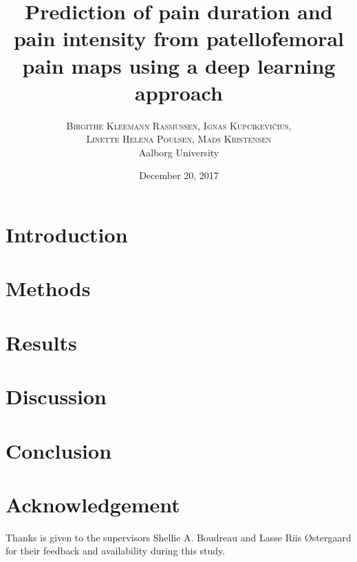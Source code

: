 \documentclass[twoside,twocolumn]{article}
\title{\huge Prediction of pain duration and pain intensity \newline from patellofemoral pain maps using a \newline deep learning approach} %
\author{%
\textsc{Birgithe Kleemann Rasmussen, Ignas Kupcikevičius,} \\
\textsc{Linette Helena Poulsen, Mads Kristensen}
 \\[1ex] %
\normalsize Aalborg University \\ %
}
\date{December 20, 2017} %
\begin{document}
\maketitle


\section{Introduction}



\section{Methods}



\vspace{-0.5cm}
\section{Results}



\section{Discussion}



\section{Conclusion}


\section{Acknowledgement}
Thanks is given to the supervisors Shellie A. Boudreau and Lasse Riis Østergaard for their feedback and availability during this study.  

\end{document}
